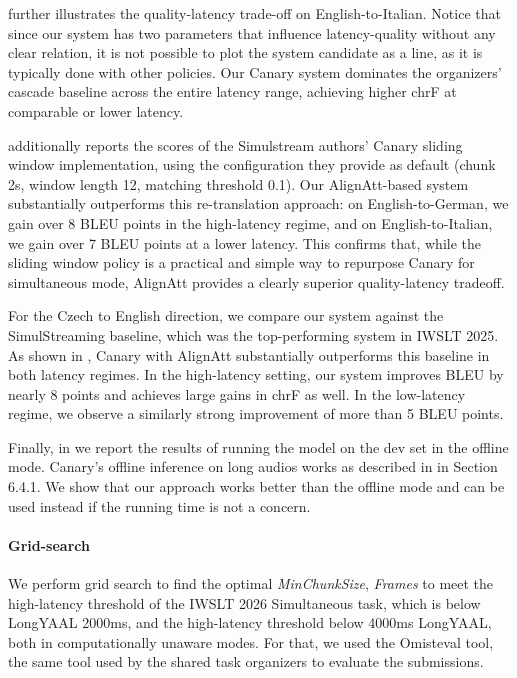 \documentclass[11pt]{article}
\begin{document}
 further illustrates the quality-latency trade-off on English-to-Italian. Notice that since our system has two parameters that influence latency-quality without any clear relation, it is not possible to plot the system candidate as a line, as it is typically done with other policies. Our Canary system dominates the organizers' cascade baseline across the entire latency range, achieving higher chrF at comparable or lower latency.

\label{sec:results}

 additionally reports the scores of the Simulstream authors' Canary sliding window implementation, using the configuration they provide as default (chunk 2s, window length 12, matching threshold 0.1). Our AlignAtt-based system substantially outperforms this re-translation approach: on English-to-German, we gain over 8 BLEU points in the high-latency regime, and on English-to-Italian, we gain over 7 BLEU points at a lower latency. This confirms that, while the sliding window policy is a practical and simple way to repurpose Canary for simultaneous mode, AlignAtt provides a clearly superior quality-latency tradeoff. 

For the Czech to English direction, we compare our system against the SimulStreaming baseline, which was the top-performing system in IWSLT 2025. As shown in , Canary with AlignAtt substantially outperforms this baseline in both latency regimes. In the high-latency setting, our system improves BLEU by nearly 8 points and achieves large gains in chrF as well. In the low-latency regime, we observe a similarly strong improvement of more than 5 BLEU points.

Finally, in  we report the results of running the model on the dev set in the offline mode. Canary's offline inference on long audios works as described in \cite{sekoyan2025canarybv} in Section 6.4.1. We show that our approach works better than the offline mode and can be used instead if the running time is not a concern.

\paragraph{Grid-search}
We perform grid search to find the optimal \textit{MinChunkSize}, \textit{Frames} to meet the high-latency threshold of the IWSLT 2026 Simultaneous task, which is below LongYAAL 2000ms, and the high-latency threshold below 4000ms LongYAAL, both in computationally unaware modes. For that, we used the Omisteval\citep{polk2025better} tool, the same tool used by the shared task organizers to evaluate the submissions.
\end{document}
